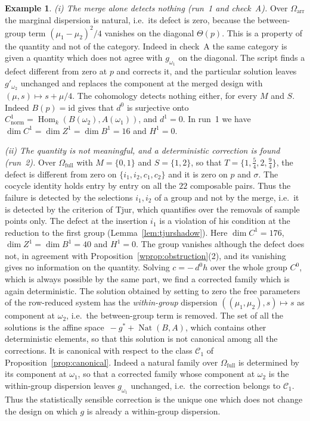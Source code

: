 \documentclass[11pt,a4paper]{article}
\theoremstyle{plain}
\theoremstyle{definition}
\newtheorem{example}[theorem]{Example}
\theoremstyle{remark}
\newcommand{\cat}[1]{\mathsf{#1}}
\newcommand{\catO}{\cat{\Omega}}
\newcommand{\id}{\mathrm{id}}
\DeclareMathOperator{\Nat}{Nat}
\DeclareMathOperator{\Hom}{Hom}
\begin{document}
\begin{example}\label{ex:oneway-findings}
\emph{(i) The merge alone detects nothing (run~1 and check~A).} Over
$\catO_{\mathrm{arr}}$ the marginal dispersion is natural, i.e.\ its defect
is zero, because the between-group term $(\mu_1-\mu_2)^2/4$ vanishes on the
diagonal $\Theta(p)$. This is a property of the quantity and not of the
category. Indeed in check~A the same category is given a quantity which does
not agree with $g_{\omega_1}$ on the diagonal. The script finds a defect
different from zero at $p$ and corrects it, and the particular solution leaves
$g'_{\omega_2}$ unchanged and replaces the component at the merged design with
$(\mu,s) \mapsto s + \mu/4$. The cohomology detects nothing either, for every
$M$ and $S$. Indeed $B(p) = \id$ gives that $d^{0}$ is surjective onto
$C^{1}_{\mathrm{norm}} = \Hom_k(B(\omega_2),A(\omega_1))$, and $d^{1} = 0$. In
run~1 we have $\dim C^{1} = \dim Z^{1} = \dim B^{1} = 16$ and $H^{1} = 0$.

\emph{(ii) The quantity is not meaningful, and a deterministic correction is
found (run~2).} Over $\catO_{\mathrm{full}}$ with $M = \{0,1\}$ and
$S = \{1,2\}$, so that $T = \{1,\tfrac54,2,\tfrac94\}$, the defect is
different from zero on $\{i_1,i_2,c_1,c_2\}$ and it is zero on $p$ and
$\sigma$. The cocycle identity holds entry by entry on all the $22$ composable
pairs. Thus the failure is detected by the selections $i_1, i_2$ of a group and
not by the merge, i.e.\ it is detected by the criterion of Tjur, which
quantifies over the removals of sample points only. The defect at the
insertion $i_1$ is a violation of his condition at the reduction to the first
group (Lemma~\ref{lem:tjurshadow}). Here $\dim C^{1} = 176$,
$\dim Z^{1} = \dim B^{1} = 40$ and $H^{1} = 0$. The group vanishes although the
defect does not, in agreement with Proposition~\ref{wprop:obstruction}(2), and
its vanishing gives no information on the quantity. Solving $c = -\,d^{0}h$
over the whole group $C^{0}$, which is always possible by the same part, we
find a corrected family which is again deterministic. The solution obtained by
setting to zero the free parameters of the row-reduced system has the
\emph{within-group} dispersion $((\mu_1,\mu_2),s) \mapsto s$ as component at
$\omega_2$, i.e.\ the between-group term is removed. The set of all the
solutions is the affine space $\,-g^{*} + \Nat(B,A)$, which contains other
deterministic elements, so that this solution is not canonical among all the
corrections. It is canonical with respect to the class $\mathcal{C}_{1}$ of
Proposition~\ref{prop:canonical}. Indeed a natural family over
$\catO_{\mathrm{full}}$ is determined by its component at $\omega_1$, so that a
corrected family whose component at $\omega_2$ is the within-group dispersion
leaves $g_{\omega_1}$ unchanged, i.e.\ the correction belongs to
$\mathcal{C}_{1}$. Thus the statistically sensible correction is the unique
one which does not change the design on which $g$ is already a within-group
dispersion.


\end{example}
\end{document}
